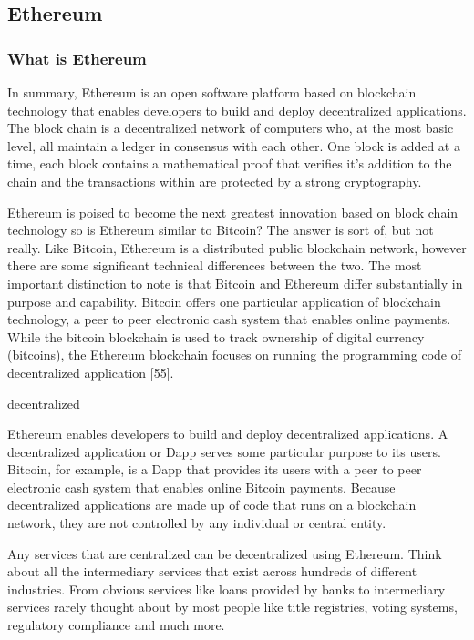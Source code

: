 \documentclass{article}
\begin{document}
\cleardoublepage
\subsection{Ethereum}
\subsubsection{What is Ethereum}
In summary, Ethereum is an open software platform based on blockchain technology that enables developers to build and deploy decentralized applications. The block chain is a decentralized network of computers who, at the most basic level, all maintain a ledger in consensus with each other. One block is added at a time, each block contains a mathematical proof that verifies it's addition to the chain and the transactions within are protected by a strong cryptography.
 
Ethereum is poised to become the next greatest innovation based on block chain technology so is Ethereum similar to Bitcoin? The answer is sort of, but not really. Like Bitcoin, Ethereum is a distributed public blockchain network, however there are some significant technical differences between the two. The most important distinction to note is that Bitcoin and Ethereum differ substantially in purpose and capability. Bitcoin offers one particular application of blockchain technology, a peer to peer electronic cash system that enables online payments. While the bitcoin blockchain is used to track ownership of digital currency (bitcoins), the Ethereum blockchain focuses on running the programming code of decentralized application {\Large [55]}.






\cleardoublepage

decentralized

Ethereum enables developers to build and deploy decentralized applications. A decentralized application or Dapp serves some particular purpose to its users. Bitcoin, for example, is a Dapp that provides its users with a peer to peer electronic cash system that enables online Bitcoin payments. Because decentralized applications are made up of code that runs on a blockchain network, they are not controlled by any individual or central entity.

Any services that are centralized can be decentralized using Ethereum. Think about all the intermediary services that exist across hundreds of different industries. From obvious services like loans provided by banks to intermediary services rarely thought about by most people like title registries, voting systems, regulatory compliance and much more.
\end{document}
